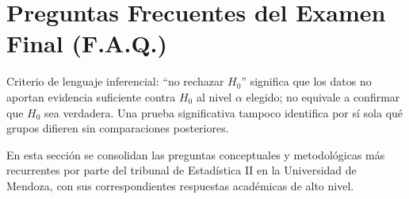\documentclass[11pt,a4paper]{article}
\begin{document}
\newpage
\section{Preguntas Frecuentes del Examen Final (F.A.Q.)}

\begin{importante}
Criterio de lenguaje inferencial: ``no rechazar $H_0$'' significa que los datos no aportan evidencia suficiente contra $H_0$ al nivel $\alpha$ elegido; no equivale a confirmar que $H_0$ sea verdadera. Una prueba significativa tampoco identifica por sí sola qué grupos difieren sin comparaciones posteriores.
\end{importante}

En esta sección se consolidan las preguntas conceptuales y metodológicas más recurrentes por parte del tribunal de Estadística II en la Universidad de Mendoza, con sus correspondientes respuestas académicas de alto nivel.
\end{document}
